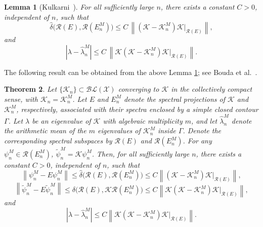 \documentclass[]{interact}
\theoremstyle{plain}%
\newtheorem{theorem}{Theorem}[section]
\newtheorem{lemma}[theorem]{Lemma}
\theoremstyle{definition}
\theoremstyle{remark}
\newcommand{\norm}[1]{\left\lVert #1\right\rVert}
\begin{document}
\begin{lemma}[Kulkarni~\cite{RPK6}]\label{Lem:03}
	For all sufficiently large $n$, there exists a constant $C>0$, independent of
	$n$, such that
	\begin{equation*}\label{Eq:gap_modified}
		\hat{\delta}\bigl(\mathcal{R}(E),\mathcal{R}(E_n^M)\bigr)
		\le
		C\,
		\norm{(\mathcal{K}-\mathcal{K}_n^M)\mathcal{K}
			\big|_{\mathcal{R}(E)}},
	\end{equation*}
	and
	\begin{equation*}\label{Eq:eigenvalue_modified}
		|{\lambda - \hat{\lambda}_n^M}|
		\le
		C\,
		\norm{\mathcal{K}(\mathcal{K}-\mathcal{K}_n^M)\mathcal{K}
			\big|_{\mathcal{R}(E)}}.
	\end{equation*}
\end{lemma}

\noindent
The following result can be obtained from the above Lemma \ref{Lem:03}; see Bouda et al.~\cite{HB-CA-ZEA-KK}.
\begin{theorem}\label{Thm:02}
	Let $\{\mathcal{K}_n\}\subset \mathcal{BL}(\mathcal{X})$ converging to $\mathcal{K}$ in the collectively compact sense, with $\mathcal{K}_n=\mathcal{K}_n^M$. Let $E$ and $E_n^M$ denote the spectral
	projections of $\mathcal{K}$ and $\mathcal{K}_n^M$, respectively, associated with their spectra enclosed by a simple closed contour $\Gamma$. Let $\lambda$ be an eigenvalue of $\mathcal{K}$ with algebraic multiplicity $m$, and let $\hat{\lambda}_n^M$ denote the arithmetic mean of the $m$ eigenvalues of $\mathcal{K}_n^M$ inside $\Gamma$. Denote the corresponding spectral subspaces by $\mathcal{R}(E)$ and $\mathcal{R}(E_n^M)$. For any $\psi_n^M \in \mathcal{R}(E_n^M)$, $\widetilde{\psi}_n^M = \mathcal{K} \psi_n^M$. Then, for all sufficiently large $n$, there exists a constant $C>0$, independent of $n$, such that
	\begin{equation*} \label{eq: mod_roc}
		\norm{\psi_n^M - E \psi_n^M} \leq \hat{\delta} \big(\mathcal{R}(E), \mathcal{R}(E_n^M)\big) \leq C \norm{(\mathcal{K} - \mathcal{K}_n^M)\mathcal{K}|_{\mathcal{R}(E)}},
	\end{equation*}
	\begin{equation*} \label{eq: itmod_roc}
		\norm{\widetilde{\psi}_n^M - E \widetilde{\psi}_n^M} \leq \delta\big(\mathcal{R}(E), \mathcal{K} \mathcal{R}(E_n^M)\big) \leq C \norm{\mathcal{K}(\mathcal{K} - \mathcal{K}_n^M)\mathcal{K}|_{\mathcal{R}(E)}},
	\end{equation*}
	and 
	\begin{equation*} \label{eq: mod_eig}
		| \lambda - \hat{\lambda}_n^M | \leq C \norm{ \mathcal{K}(\mathcal{K} -  \mathcal{K}_n^M)\mathcal{K}|_{\mathcal{R}(E)}}.
	\end{equation*}
\end{theorem}
\end{document}
